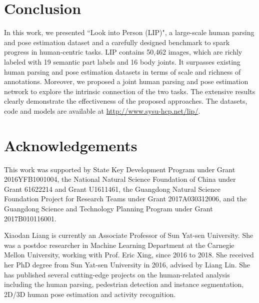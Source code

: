 \documentclass[10pt,journal,compsoc]{IEEEtran}
\begin{document}
\section{Conclusion}
In this work, we presented ``Look into Person (LIP)", a large-scale human parsing and pose estimation dataset and a carefully designed benchmark to spark progress in human-centric tasks. LIP contains 50,462 images, which are richly labeled with 19 semantic part labels and 16 body joints. It surpasses existing human parsing and pose estimation datasets in terms of scale and richness of annotations. Moreover, we proposed a joint human parsing and pose estimation network to explore the intrinsic connection of the two tasks. The extensive results clearly demonstrate the effectiveness of the proposed approaches. The datasets, code and models are available at \url{http://www.sysu-hcp.net/lip/}.










\section*{Acknowledgements}

This work was supported by State Key Development Program under Grant 2016YFB1001004, the National Natural Science Foundation of China under Grant 61622214 and Grant U1611461, the Guangdong Natural Science Foundation Project for Research Teams under Grant 2017A030312006, and the Guangdong Science and Technology Planning
Program under Grant 2017B010116001.

\ifCLASSOPTIONcaptionsoff
  \newpage
\fi



{\small


}




\begin{IEEEbiography}{Xiaodan Liang}
is currently an Associate Professor of Sun Yat-sen University. She was a postdoc researcher in Machine Learning Department at the Carnegie Mellon University, working with Prof. Eric Xing, since 2016 to 2018. She received her PhD degree from Sun Yat-sen University in 2016, advised by Liang Lin. She has published several cutting-edge projects on the human-related analysis including the human parsing, pedestrian detection and instance segmentation, 2D/3D human pose estimation and activity recognition.
\end{IEEEbiography}
\end{document}
